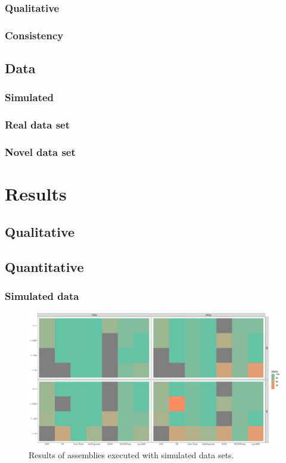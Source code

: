 \subsubsection{Qualitative}
\subsubsection{Consistency}


\subsection{Data}
\subsubsection{Simulated}
\subsubsection{Real data set}
\subsubsection{Novel data set}


\section{Results} \label{results:ca}
\subsection{Qualitative}

\subsection{Quantitative}
\subsubsection{Simulated data}
\begin{figure}[H]
\centering
\includegraphics[height=.45\textheight, width=.95\textwidth]{Figures/sim_tiles}
\decoRule
\caption[Score of assemblies of simulated data sets]{Results of assemblies executed with simulated data sets.}
\label{fig:sim_tiles}
\end{figure}



